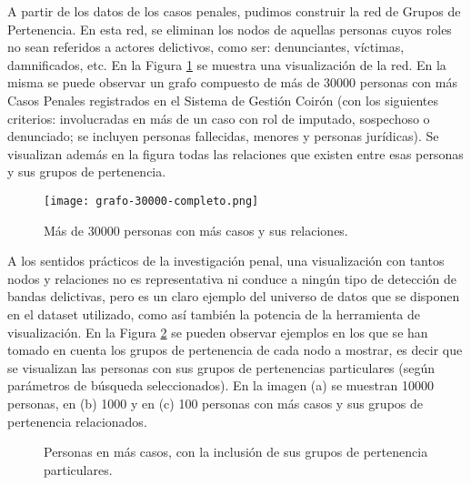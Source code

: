 A partir de los datos de los casos penales, pudimos construir la red de Grupos de Pertenencia. En esta red, se eliminan los nodos de aquellas personas cuyos roles no sean referidos a actores delictivos, como ser: denunciantes, víctimas, damnificados, etc. En la Figura \ref{fig:grafocompleto} se muestra una visualización de la red. En la misma se puede observar un grafo compuesto de más de 30000 personas con más Casos Penales registrados en el Sistema de Gestión Coirón (con los siguientes criterios: involucradas en más de un caso con rol de imputado, sospechoso o denunciado; se incluyen personas fallecidas, menores y personas jurídicas). Se visualizan además en la figura todas las relaciones que existen entre esas personas y sus grupos de pertenencia.

\begin{figure}
	\centering
	\texttt{[image: grafo-30000-completo.png]}
	\caption{Más de 30000 personas con más casos y sus relaciones.} 
	\label{fig:grafocompleto}
\end{figure}

A los sentidos prácticos de la investigación penal, una visualización con tantos nodos y relaciones no es representativa ni conduce a ningún tipo de detección de bandas delictivas, pero es un claro ejemplo del universo de datos que se disponen en el dataset utilizado, como así también la potencia de la herramienta de visualización. En la Figura \ref{fig:grafosCompletos} se pueden observar ejemplos en los que se han tomado en cuenta los grupos de pertenencia de cada nodo a mostrar, es decir que se visualizan las personas con sus grupos de pertenencias particulares (según parámetros de búsqueda seleccionados). En la imagen (a) se muestran 10000 personas, en (b) 1000 y en (c) 100 personas con más casos y sus grupos de pertenencia relacionados.

\begin{figure}[htbp]
	\centering
	\centering
	\caption{ Personas en más casos, con la inclusión de sus grupos de pertenencia particulares.}
	\label{fig:grafosCompletos}
\end{figure}

